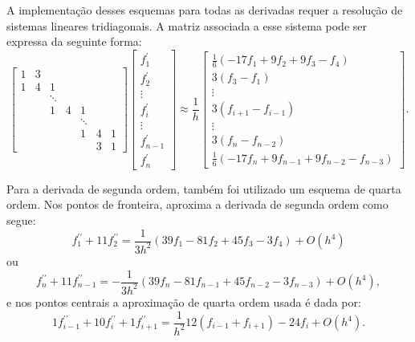 A implementação desses esquemas para todas as derivadas requer a resolução de sistemas lineares tridiagonais. A matriz associada a esse sistema pode ser expressa da seguinte forma:
\begin{equation}
\left[\begin{array}{ccccccc}
1 & 3 & & & & & \\
1 & 4 & 1 & & & & \\
& & \ddots & & & & \\
& & 1 & 4 & 1 & & \\
& & & & \ddots & & \\
& & & & 1 & 4 & 1 \\
& & & & & 3 & 1
\end{array}\right]\left[\begin{array}{c}
f_1^{\prime} \\
f_2^{\prime} \\
\vdots \\
f_i^{\prime} \\
\vdots \\
f_{n-1}^{\prime} \\
f_n^{\prime}
\end{array}\right] \approx \frac{1}{h}\left[\begin{array}{c}\frac{1}{6}\left(-17f_1 + 9f_2 + 9f_3 - f_4 \right) \\ 3(f_3 - f_1) \\ \vdots \\ 3\left(f_{i+1}-f_{i-1}\right) \\ \vdots \\ 3\left(f_{n}-f_{n-2}\right) \\ \frac{1}{6}\left(-17f_n + 9f_{n-1} + 9f_{n-2} - f_{n-3}\right)\end{array}\right].
\end{equation}

Para a derivada de segunda ordem, também foi utilizado um esquema de quarta ordem. Nos pontos de fronteira, aproxima a derivada de segunda ordem como segue:
\begin{equation}
    f_1^{\prime \prime} + 11f_{2}^{\prime \prime} = \frac{1}{3h^{2}}\left(39f_{1} - 81f_{2} + 45f_{3} - 3f_{4}\right)+O\left(h^4\right)
\end{equation}
ou
\begin{equation}
    f_{n}^{\prime \prime} + 11f_{n-1}^{\prime \prime} = -\frac{1}{3h^{2}}\left(39f_{n} - 81f_{n-1} + 45f_{n-2} - 3f_{n-3}\right)+O\left(h^4\right),
\end{equation}
e nos pontos centrais a aproximação de quarta ordem usada é dada por:
\begin{equation}
    1 f_{i-1}^{\prime \prime}+10 f_i^{\prime \prime}+1 f_{i+1}^{\prime \prime}=\frac{1}{ h^2}12\left(f_{i-1} + f_{i+1}\right) -24f_{i}+O\left(h^4\right) .
\end{equation}

